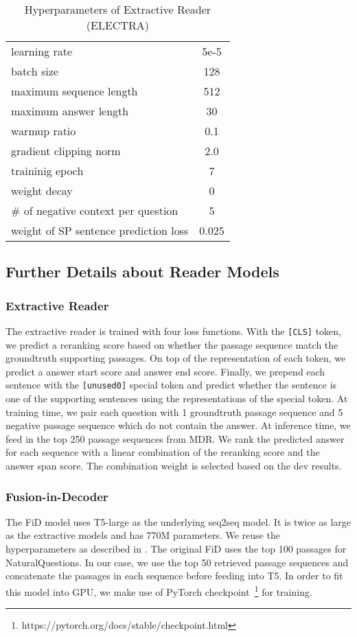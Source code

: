 \documentclass{article} \usepackage{iclr2021_conference,times}
\newcommand{\method}{MDR\xspace}
\begin{document}
\begin{table}[h]
    \centering
    \caption{Hyperparameters of Extractive Reader (ELECTRA)}
    \begin{tabular}{lc}
    \toprule
        learning rate & 5e-5\\
        batch size & 128 \\
        maximum sequence length & 512 \\
        maximum answer length & 30 \\
warmup ratio & 0.1 \\
        gradient clipping norm & 2.0 \\
        traininig epoch & 7 \\
        weight decay & 0 \\
        \# of negative context per question & 5 \\
        weight of SP sentence prediction loss & 0.025 \\
    \bottomrule
    \end{tabular}
    \label{tab:my_label}
\end{table}

\subsection{Further Details about Reader Models}
\label{appendix:multihop_rag}

\subsubsection{Extractive Reader}
The extractive reader is trained with four loss functions. With the \texttt{[CLS]} token, we predict a reranking score based on whether the passage sequence match the groundtruth supporting passages. On top of the representation of each token, we predict a answer start score and answer end score. Finally, we prepend each sentence with the \texttt{[unused0]} special token and predict whether the sentence is one of the supporting sentences using the representations of the special token. At training time, we pair each question with 1 groundtruth passage sequence and 5 negative passage sequence which do not contain the answer. At inference time, we feed in the top 250 passage sequences from \method. We rank the predicted answer for each sequence with a linear combination of the reranking score and the answer span score. The combination weight is selected based on the dev results.

\subsubsection{Fusion-in-Decoder}
The FiD model uses T5-large as the underlying seq2seq model. It is twice as large as the extractive models and has 770M parameters. We reuse the hyperparameters as described in \citet{FiD}. The original FiD uses the top 100 passages for NaturalQuestions. In our case, we use the top 50 retrieved passage sequences and concatenate the passages in each sequence before feeding into T5. In order to fit this model into GPU, we make use of PyTorch checkpoint~\footnote{https://pytorch.org/docs/stable/checkpoint.html} for training. 
\end{document}
